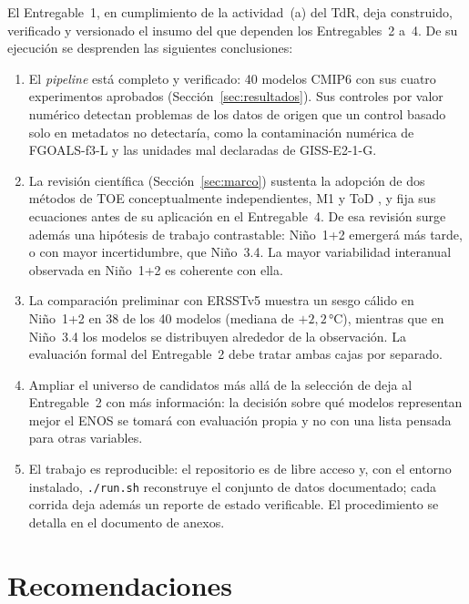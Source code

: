El Entregable~1, en cumplimiento de la actividad~(a) del TdR, deja construido, verificado y versionado el insumo del que dependen los Entregables~2 a~4. De su ejecución se desprenden las siguientes conclusiones:

\begin{enumerate}[label=(\roman*)]
\item El \emph{pipeline} está completo y verificado: 40 modelos CMIP6 con sus cuatro experimentos aprobados (Sección~\ref{sec:resultados}). Sus controles por valor numérico detectan problemas de los datos de origen que un control basado solo en metadatos no detectaría, como la contaminación numérica de FGOALS-f3-L y las unidades mal declaradas de GISS-E2-1-G.

\item La revisión científica (Sección~\ref{sec:marco}) sustenta la adopción de dos métodos de TOE conceptualmente independientes, M1 \citep{szabo2016} y ToD \citep{gopika2024}, y fija sus ecuaciones antes de su aplicación en el Entregable~4. De esa revisión surge además una hipótesis de trabajo contrastable: Niño~1+2 emergerá más tarde, o con mayor incertidumbre, que Niño~3.4. La mayor variabilidad interanual observada en Niño~1+2 es coherente con ella.

\item La comparación preliminar con ERSSTv5 muestra un sesgo cálido en Niño~1+2 en 38 de los 40 modelos (mediana de $+2{,}2$\,°C), mientras que en Niño~3.4 los modelos se distribuyen alrededor de la observación. La evaluación formal del Entregable~2 debe tratar ambas cajas por separado.

\item Ampliar el universo de candidatos más allá de la selección de \citet{bruno2023} deja al Entregable~2 con más información: la decisión sobre qué modelos representan mejor el ENOS se tomará con evaluación propia y no con una lista pensada para otras variables.

\item El trabajo es reproducible: el repositorio  es de libre acceso y, con el entorno instalado, \texttt{./run.sh} reconstruye el conjunto de datos documentado; cada corrida deja además un reporte de estado verificable. El procedimiento se detalla en el documento de anexos.
\end{enumerate}

\section{Recomendaciones}
\label{sec:recomendaciones}

